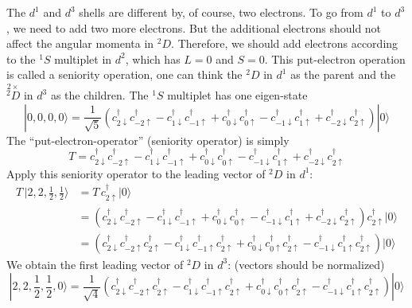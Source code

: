 The $d^1$ and $d^3$ shells are different by, of course, two electrons. To go from
$d^1$ to $d^3$, we need to add two more electrons. But the additional electrons
should not affect the angular momenta in $^2D$. Therefore, we should add electrons
according to the $^1S$ multiplet in $d^2$, which has $L=0$ and $S=0$.
This put-electron operation is called a seniority operation, one can think
the $^2D$ in $d^1$ as the parent and the $\stackrel{2\times}{^{2}D}$ in $d^3$ as the children.
The $^1S$ multiplet has one eigen-state
\begin{equation}
|0,0,0,0\rangle = \frac{1}{\sqrt{5}} \left( c_{2\downarrow}^\dagger c_{-2\uparrow}^\dagger -c_{1\downarrow}^\dagger c_{-1\uparrow}^\dagger +c_{0\downarrow}^\dagger c_{0\uparrow}^\dagger -c_{-1\downarrow}^\dagger c_{1\uparrow}^\dagger +c_{-2\downarrow}^\dagger c_{2\uparrow}^\dagger \right)|0\rangle
\end{equation}
%
The ``put-electron-operator'' (seniority operator) is simply
\begin{equation}
T = c_{2\downarrow}^\dagger c_{-2\uparrow}^\dagger -c_{1\downarrow}^\dagger c_{-1\uparrow}^\dagger +c_{0\downarrow}^\dagger c_{0\uparrow}^\dagger -c_{-1\downarrow}^\dagger c_{1\uparrow}^\dagger +c_{-2\downarrow}^\dagger c_{2\uparrow}^\dagger
\end{equation}
%
Apply this seniority operator to the leading vector of $^2D$ in $d^1$:
\begin{align}
T\, |2,2,\frac{1}{2},\frac{1}{2}\rangle & = T\, c_{2\uparrow}^\dagger |0\rangle \nonumber \\
& = \left( c_{2\downarrow}^\dagger c_{-2\uparrow}^\dagger -c_{1\downarrow}^\dagger c_{-1\uparrow}^\dagger +c_{0\downarrow}^\dagger c_{0\uparrow}^\dagger -c_{-1\downarrow}^\dagger c_{1\uparrow}^\dagger +c_{-2\downarrow}^\dagger c_{2\uparrow}^\dagger \right) c_{2\uparrow}^\dagger |0\rangle \nonumber \\
& = \left( c_{2\downarrow}^\dagger c_{-2\uparrow}^\dagger c_{2\uparrow}^\dagger -c_{1\downarrow}^\dagger c_{-1\uparrow}^\dagger c_{2\uparrow}^\dagger +c_{0\downarrow}^\dagger c_{0\uparrow}^\dagger c_{2\uparrow}^\dagger -c_{-1\downarrow}^\dagger c_{1\uparrow}^\dagger c_{2\uparrow}^\dagger \right) |0\rangle
\end{align}
%
We obtain the first leading vector of $^2D$ in $d^3$: (vectors should be normalized)
\begin{equation} \label{eq:snv1}
|2,2,\frac{1}{2},\frac{1}{2},0\rangle = \frac{1}{\sqrt{4}} \left( c_{2\downarrow}^\dagger c_{-2\uparrow}^\dagger c_{2\uparrow}^\dagger -c_{1\downarrow}^\dagger c_{-1\uparrow}^\dagger c_{2\uparrow}^\dagger +c_{0\downarrow}^\dagger c_{0\uparrow}^\dagger c_{2\uparrow}^\dagger -c_{-1\downarrow}^\dagger c_{1\uparrow}^\dagger c_{2\uparrow}^\dagger \right)|0\rangle
\end{equation}
